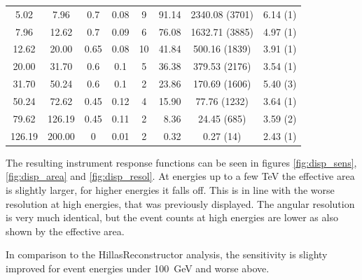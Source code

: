 \begin{tabular}{c c c c c r c c}
        \num{5.02} & \num{7.96} & 0.7 & 0.08 & 9 & \num{91.14} & \num{2340.08} (\num{3701}) & \num{6.14} (\num{1}) \\
        \num{7.96} & \num{12.62} & 0.7 & 0.09 & 6 & \num{76.08} & \num{1632.71} (\num{3885}) & \num{4.97} (\num{1}) \\
        \num{12.62} & \num{20.00} & 0.65 & 0.08 & 10 & \num{41.84} & \num{500.16} (\num{1839}) & \num{3.91} (\num{1}) \\
        \num{20.00} & \num{31.70} & 0.6 & 0.1 & 5 & \num{36.38} & \num{379.53} (\num{2176}) & \num{3.54} (\num{1}) \\
        \num{31.70} & \num{50.24} & 0.6 & 0.1 & 2 & \num{23.86} & \num{170.69} (\num{1606}) & \num{5.40} (\num{3}) \\
        \num{50.24} & \num{72.62} & 0.45 & 0.12 & 4 & \num{15.90} & \num{77.76} (\num{1232}) & \num{3.64} (\num{1}) \\
        \num{79.62} & \num{126.19} & 0.45 & 0.11 & 2 & \num{8.36} & \num{24.45} (\num{685}) & \num{3.59} (\num{2}) \\
        \num{126.19} & \num{200.00} & 0 & 0.01 & 2 & \num{0.32} & \num{0.27} (\num{14}) & \num{2.43} (\num{1}) \\
    \end{tabular}
\clearpage
\newpage
\normalsetting

The resulting instrument response functions can be seen in figures
\ref{fig:disp_sens}, \ref{fig:disp_area} and \ref{fig:disp_resol}.
At energies up to a few \si{\tera\electronvolt} the effective area is slightly larger, 
for higher energies it falls off.
This is in line with the worse resolution at high energies, that was
previously displayed.
The angular resolution is very much identical, but
the event counts at high energies are lower as also shown by the effective area.

In comparison to the HillasReconstructor analysis, the sensitivity
is slighty improved for event energies under \SI{100}{\giga\electronvolt} and 
worse above.



